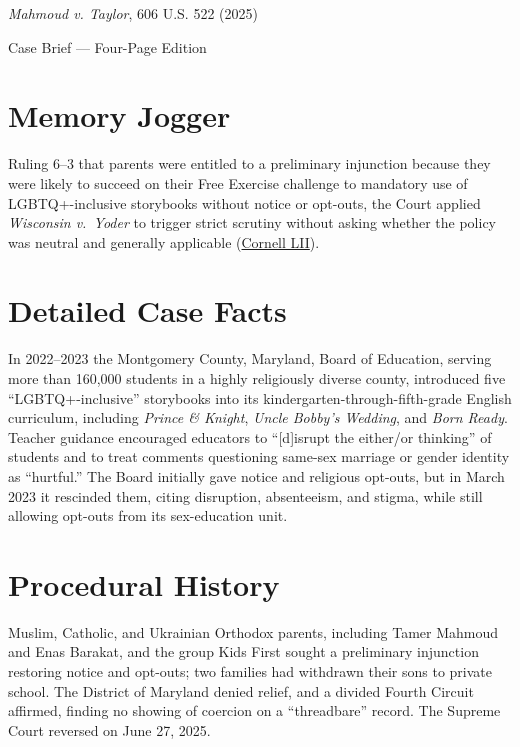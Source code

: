 \documentclass[12pt]{article}
\begin{document}
\begin{center}
{\LARGE \textit{Mahmoud v. Taylor}, 606 U.S. 522 (2025)\par}
\vspace{0.8em}
{\large Case Brief --- Four-Page Edition\par}
\end{center}
\vspace{1em}

\section{Memory Jogger}

Ruling 6--3 that parents were entitled to a preliminary injunction because they were likely to succeed on their Free Exercise challenge to mandatory use of LGBTQ+-inclusive storybooks without notice or opt-outs, the Court applied \textit{Wisconsin v.\ Yoder} to trigger strict scrutiny without asking whether the policy was neutral and generally applicable (\href{https://www.law.cornell.edu/supremecourt/text/24-297}{Cornell LII}).

\section{Detailed Case Facts}

In 2022--2023 the Montgomery County, Maryland, Board of Education, serving more than 160,000 students in a highly religiously diverse county, introduced five ``LGBTQ+-inclusive'' storybooks into its kindergarten-through-fifth-grade English curriculum, including \textit{Prince \& Knight}, \textit{Uncle Bobby's Wedding}, and \textit{Born Ready}. Teacher guidance encouraged educators to ``[d]isrupt the either/or thinking'' of students and to treat comments questioning same-sex marriage or gender identity as ``hurtful.'' The Board initially gave notice and religious opt-outs, but in March 2023 it rescinded them, citing disruption, absenteeism, and stigma, while still allowing opt-outs from its sex-education unit.

\section{Procedural History}

Muslim, Catholic, and Ukrainian Orthodox parents, including Tamer Mahmoud and Enas Barakat, and the group Kids First sought a preliminary injunction restoring notice and opt-outs; two families had withdrawn their sons to private school. The District of Maryland denied relief, and a divided Fourth Circuit affirmed, finding no showing of coercion on a ``threadbare'' record. The Supreme Court reversed on June 27, 2025.
\end{document}
